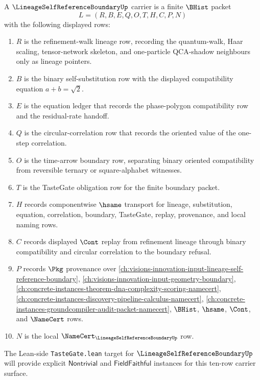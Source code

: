 \begin{definition}
\label{def:lineage-self-reference-boundary-carrier}
A $\LineageSelfReferenceBoundaryUp$ carrier is a finite $\BHist$ packet
$$
L=(R,B,E,Q,O,T,H,C,P,N)
$$
with the following displayed rows:
\begin{enumerate}
\item $R$ is the refinement-walk lineage row, recording the quantum-walk, Haar scaling, tensor-network skeleton, and one-particle QCA-shadow neighbours only as lineage pointers.
\item $B$ is the binary self-substitution row with the displayed compatibility equation $a+b=\sqrt2$.
\item $E$ is the equation ledger that records the phase-polygon compatibility row and the residual-rate handoff.
\item $Q$ is the circular-correlation row that records the oriented value of the one-step correlation.
\item $O$ is the time-arrow boundary row, separating binary oriented compatibility from reversible ternary or square-alphabet witnesses.
\item $T$ is the TasteGate obligation row for the finite boundary packet.
\item $H$ records componentwise $\hsame$ transport for lineage, substitution, equation, correlation, boundary, TasteGate, replay, provenance, and local naming rows.
\item $C$ records displayed $\Cont$ replay from refinement lineage through binary compatibility and circular correlation to the boundary refusal.
\item $P$ records $\Pkg$ provenance over \autoref{ch:visions-innovation-input-lineage-self-reference-boundary}, \autoref{ch:visions-innovation-input-geometry-boundary}, \autoref{ch:concrete-instances-theorem-dna-complexity-scoring-namecert}, \autoref{ch:concrete-instances-discovery-pipeline-calculus-namecert}, \autoref{ch:concrete-instances-groundcompiler-audit-packet-namecert}, $\BHist$, $\hsame$, $\Cont$, and $\NameCert$ rows.
\item $N$ is the local $\NameCert_{\LineageSelfReferenceBoundaryUp}$ row.
\end{enumerate}
The Lean-side \texttt{TasteGate.lean} target for $\LineageSelfReferenceBoundaryUp$ will provide explicit $\mathsf{Nontrivial}$ and $\mathsf{FieldFaithful}$ instances for this ten-row carrier surface.
\end{definition}


